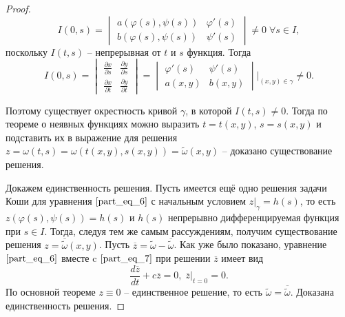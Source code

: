 \documentclass[a4paper, 12pt]{article}
\begin{document}
\begin{proof}
        \begin{equation*}
            I(0, s) = 
            \begin{vmatrix}
                a(\varphi(s), \psi(s)) & \varphi'(s) \\
                b(\varphi(s), \psi(s)) & \psi'(s)
            \end{vmatrix} \neq 0 \; \forall s \in I,
        \end{equation*}
        поскольку $I(t, s)$ -- непрерывная от $t$ и $s$ функция. Тогда
        \begin{equation*}
            I(0, s) =
            \begin{vmatrix}
                \frac{\partial x}{\partial s} & \frac{\partial y}{\partial s} \\
                \frac{\partial x}{\partial t} & \frac{\partial y}{\partial t}
            \end{vmatrix} =
            \begin{vmatrix}
                \varphi'(s) & \psi'(s) \\
                a(x, y) & b(x, y)
            \end{vmatrix} \bigg|_{(x, y) \in \gamma} \neq 0.
        \end{equation*}

        Поэтому существует окрестность кривой $\gamma$, в которой $I(t, s) \neq 0$. Тогда по теореме о неявных функциях можно выразить $t = t(x, y)$, $s = s(x, y)$ и подставить их в выражение для решения $z = \omega(t, s) = \omega(t(x, y), s(x, y)) = \widetilde{\omega}(x, y)$ -- доказано существование решения.

        Докажем единственность решения. Пусть имеется ещё одно решения задачи Коши для уравнения $\eqref{part_eq_6}$ с начальным условием $z \big|_{\gamma} = h(s)$, то есть $z(\varphi(s), \psi(s)) = h(s)$ и $h(s)$ непрерывно дифференцируемая функция при $s \in I$. Тогда, следуя тем же самым рассуждениям, получим существование решения $z = \overline{\widetilde{\omega}}(x, y)$. Пусть $\overline{z} = \widetilde{\omega} - \overline{\widetilde{\omega}}$. Как уже было показано, уравнение $\eqref{part_eq_6}$ вместе c $\eqref{part_eq_7}$ при решении $\overline{z}$ имеет вид
        \begin{equation*}
            \frac{d \overline{z}}{dt} + c \overline{z} = 0, \; \overline{z} \big|_{t = 0} = 0.
        \end{equation*}
        По основной теореме $z \equiv 0$ -- единственное решение, то есть $\widetilde{\omega} = \overline{\widetilde{\omega}}$. Доказана единственность решения.

    \end{proof}
\end{document}
